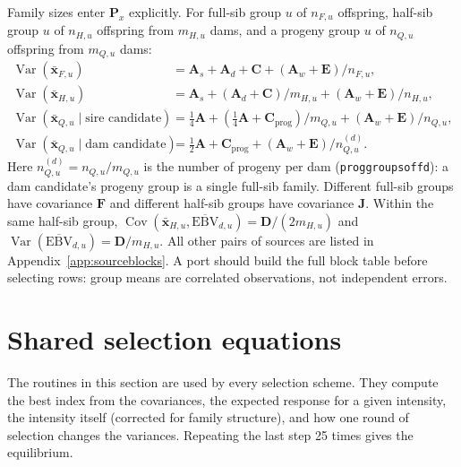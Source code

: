 \documentclass[11pt]{article}
\newcommand{\src}[1]{\texttt{#1}}
\newcommand{\Cov}{\operatorname{Cov}}
\newcommand{\Var}{\operatorname{Var}}
\newcommand{\ve}[1]{\boldsymbol{#1}}
\newcommand{\ma}[1]{\mathbf{#1}}
\begin{document}
Family sizes enter $\ma P_x$ explicitly. For full-sib group $u$ of $n_{F,u}$ offspring, half-sib group $u$ of $n_{H,u}$ offspring from $m_{H,u}$ dams, and a progeny group $u$ of $n_{Q,u}$ offspring from $m_{Q,u}$ dams:
\begin{align}\label{eq:blocks}
\Var(\bar{\ve x}_{F,u})&=\ma A_s+\ma A_d+\ma C+(\ma A_w+\ma E)/n_{F,u},\\
\Var(\bar{\ve x}_{H,u})&=\ma A_s+(\ma A_d+\ma C)/m_{H,u}
 +(\ma A_w+\ma E)/n_{H,u},\nonumber\\
\Var(\bar{\ve x}_{Q,u}\mid\text{sire candidate})&=
\tfrac14\ma A+(\tfrac14\ma A+\ma C_{\mathrm{prog}})/m_{Q,u}
+(\ma A_w+\ma E)/n_{Q,u},\nonumber\\
\Var(\bar{\ve x}_{Q,u}\mid\text{dam candidate})&=
\tfrac12\ma A+\ma C_{\mathrm{prog}}+(\ma A_w+\ma E)/n_{Q,u}^{(d)}.\nonumber
\end{align}
Here $n_{Q,u}^{(d)}=n_{Q,u}/m_{Q,u}$ is the number of progeny per dam (\src{proggroupsoffd}): a dam candidate's progeny group is a single full-sib family.
Different full-sib groups have covariance $\ma F$ and different half-sib groups have covariance $\ma J$. Within the same half-sib group,
$\Cov(\bar{\ve x}_{H,u},\overline{\mathrm{EBV}}_{d,u})=\ma D/(2m_{H,u})$ and
$\Var(\overline{\mathrm{EBV}}_{d,u})=\ma D/m_{H,u}$. All other pairs of sources are listed in Appendix~\ref{app:sourceblocks}. A port should build the full block table before selecting rows: group means are correlated observations, not independent errors.

\section{Shared selection equations}\label{sec:shared}
\begin{inwords}
The routines in this section are used by every selection scheme. They compute the best index from the covariances, the expected response for a given intensity, the intensity itself (corrected for family structure), and how one round of selection changes the variances. Repeating the last step 25 times gives the equilibrium.
\end{inwords}
\end{document}
